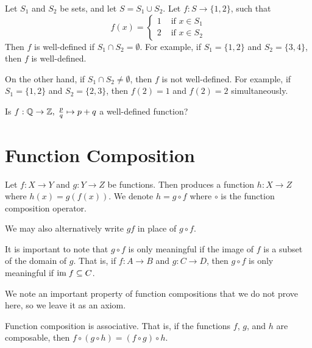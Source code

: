 \begin{example}
    Let $S_1$ and $S_2$ be sets, and let $S = S_1 \cup S_2$. Let $f: S \to \{1, 2\}$, such that
    \[
        f(x) = \begin{cases}
            1 & \textrm{ if } x \in S_1\\
            2 & \textrm{ if } x \in S_2
        \end{cases}
    \]
    Then $f$ is well-defined if $S_1 \cap S_2 = \emptyset$. For example, if $S_1 = \{1, 2\}$ and $S_2 = \{3, 4\}$, then $f$ is well-defined.

    On the other hand, if $S_1 \cap S_2 \neq \emptyset$, then $f$ is not well-defined. For example, if $S_1 = \{1, 2\}$ and $S_2 = \{2, 3\}$, then $f(2) = 1$ and $f(2) = 2$ simultaneously.
\end{example}

\begin{exercise}
    Is $f: \mathbb{Q} \to \mathbb{Z},\;\frac pq \mapsto p + q$ a well-defined function?
\end{exercise}

\section{Function Composition}
\begin{definition}
    Let $f: X \to Y$ and $g: Y \to Z$ be functions. Then  produces a function $h: X \to Z$ where $h(x) = g(f(x))$. We denote $h = g \circ f$ where $\circ$ is the function composition operator.
\end{definition}
\begin{remark}
    We may also alternatively write $gf$ in place of $g \circ f$.
\end{remark}

It is important to note that $g \circ f$ is only meaningful if the image of $f$ is a subset of the domain of $g$. That is, if $f: A \to B$ and $g: C \to D$, then $g \circ f$ is only meaningful if $\mathrm{im}\; f \subseteq C$.

We note an important property of function compositions that we do not prove here, so we leave it as an axiom.

\begin{axiom}\label{axiom-function-composition-associative}
    Function composition is associative. That is, if the functions $f$, $g$, and $h$ are composable, then $f \circ (g \circ h) = (f \circ g) \circ h$.
\end{axiom}

